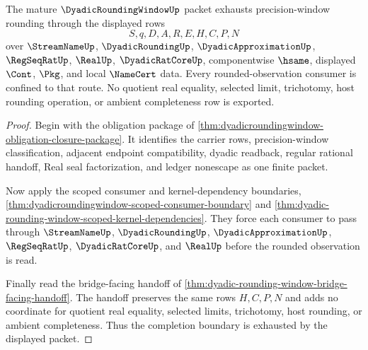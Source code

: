 \begin{theorem}
\label{thm:dyadicroundingwindow-mature-completeness-boundary}
The mature $\DyadicRoundingWindowUp$ packet exhausts precision-window rounding through the displayed rows
$$
S,q,D,A,R,E,H,C,P,N
$$
over $\StreamNameUp$, $\DyadicRoundingUp$, $\DyadicApproximationUp$, $\RegSeqRatUp$, $\RealUp$, $\DyadicRatCoreUp$, componentwise $\hsame$, displayed $\Cont$, $\Pkg$, and local $\NameCert$ data. Every rounded-observation consumer is confined to that route. No quotient real equality, selected limit, trichotomy, host rounding operation, or ambient completeness row is exported.
\end{theorem}
\begin{proof}
Begin with the obligation package of \autoref{thm:dyadicroundingwindow-obligation-closure-package}. It identifies the carrier rows, precision-window classification, adjacent endpoint compatibility, dyadic readback, regular rational handoff, Real seal factorization, and ledger nonescape as one finite packet.

Now apply the scoped consumer and kernel-dependency boundaries, \autoref{thm:dyadicroundingwindow-scoped-consumer-boundary} and \autoref{thm:dyadic-rounding-window-scoped-kernel-dependencies}. They force each consumer to pass through $\StreamNameUp$, $\DyadicRoundingUp$, $\DyadicApproximationUp$, $\RegSeqRatUp$, $\DyadicRatCoreUp$, and $\RealUp$ before the rounded observation is read.

Finally read the bridge-facing handoff of \autoref{thm:dyadic-rounding-window-bridge-facing-handoff}. The handoff preserves the same rows $H,C,P,N$ and adds no coordinate for quotient real equality, selected limits, trichotomy, host rounding, or ambient completeness. Thus the completion boundary is exhausted by the displayed packet.
\end{proof}


